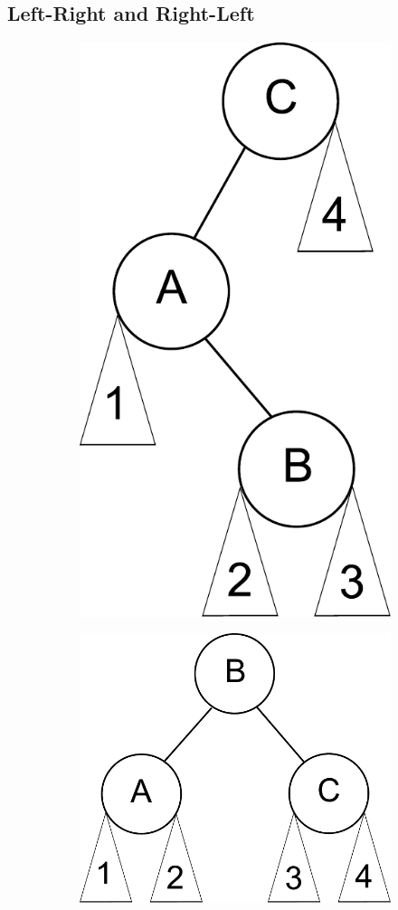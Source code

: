\subsection*{Left-Right and Right-Left}
\begin{figure}[h]
\begin{subfigure}[b]{.49\textwidth}
    \includegraphics[width=.75\textwidth]{left_right.pdf}
\end{subfigure}
\begin{subfigure}[b]{.49\textwidth}
    \includegraphics[width=.75\textwidth]{balanced.pdf}
\end{subfigure}
\end{figure}

